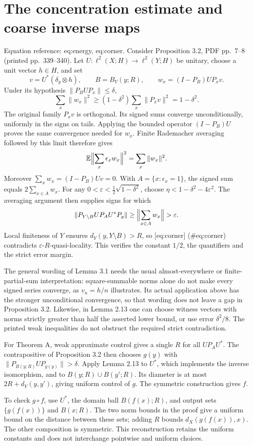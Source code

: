 \documentclass[10pt]{article}
\begin{document}
\section*{The concentration estimate and coarse inverse maps}
Equation reference: eq:energy, eq:corner. Consider Proposition 3.2, PDF pp. 7–8 (printed pp. 339–340). Let \(U:\ell^2(X;H)\to\ell^2(Y;H)\) be unitary, choose a unit vector \(h\in H\), and set \[v=U^*(\delta_y\otimes h),\qquad B=B_Y(y;R),\qquad
 w_x=(I-P_B)UP_xv .\] Under its hypothesis \(\|P_BU P_x\|\le\delta\), \[
 \sum_x\|w_x\|^2
 \ge (1-\delta^2)\sum_x\|P_xv\|^2
 =1-\delta^2.\] The original family \(P_xv\) is orthogonal. Its signed sums converge unconditionally, uniformly in the signs on tails. Applying the bounded operator \((I-P_B)U\) proves the same convergence needed for \(w_x\). Finite Rademacher averaging followed by this limit therefore gives \[\mathbb E\Bigl\|\sum_x\epsilon_xw_x\Bigr\|^2
       =\sum_x\|w_x\|^2 .\] Moreover \(\sum_xw_x=(I-P_B)Uv=0\). With \(A=\{x:\epsilon_x=1\}\), the signed sum equals \(2\sum_{x\in A}w_x\). For any \(0<\varepsilon<\frac12\sqrt{1-\delta^2}\), choose \(\eta<1-\delta^2-4\varepsilon^2\). The averaging argument then supplies signs for which \[
 \|P_{Y\setminus B}UP_AU^*P_y\|
 \ge \Bigl\|\sum_{x\in A}w_x\Bigr\|
 >\varepsilon.\] Local finiteness of \(Y\) ensures \(d_Y(y,Y\setminus B)>R\), so [eq:corner] (\#eq:corner) contradicts \(\varepsilon\)-\(R\)-quasi-locality. This verifies the constant \(1/2\), the quantifiers and the strict error margin.\par
The general wording of Lemma 3.1 needs the usual almost-everywhere or finite-partial-sum interpretation: square-summable norms alone do not make every signed series converge, as \(v_n=h/n\) illustrates. Its actual application above has the stronger unconditional convergence, so that wording does not leave a gap in Proposition 3.2. Likewise, in Lemma 2.13 one can choose witness vectors with norms strictly greater than half the asserted lower bound, or use error \(\delta^2/8\). The printed weak inequalities do not obstruct the required strict contradiction.\par
For Theorem A, weak approximate control gives a single \(R\) for all \(UP_AU^*\). The contrapositive of Proposition 3.2 then chooses \(g(y)\) with \(\|P_{B(y;R)}UP_{g(y)}\|>\delta\). Apply Lemma 2.13 to \(U^*\), which implements the inverse isomorphism, and to \(B(y;R)\cup B(y';R)\). Its diameter is at most \(2R+d_Y(y,y')\), giving uniform control of \(g\). The symmetric construction gives \(f\).\par
To check \(g\circ f\), use \(U^*\), the domain ball \(B(f(x);R)\), and output sets \(\{g(f(x))\}\) and \(B(x;R)\). The two norm bounds in the proof give a uniform bound on the distance between these sets; adding \(R\) bounds \(d_X(g(f(x)),x)\). The other composition is symmetric. This reconstruction retains the uniform constants and does not interchange pointwise and uniform choices.\par
\end{document}
